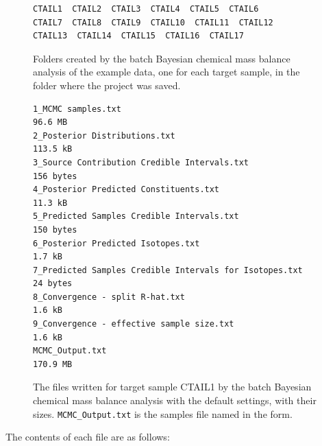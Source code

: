 \documentclass[12pt]{report}
\begin{document}
\begin{figure}[ht]
    \centering
        \begin{minipage}{0.92\textwidth}
\small
\begin{verbatim}
CTAIL1  CTAIL2  CTAIL3  CTAIL4  CTAIL5  CTAIL6
CTAIL7  CTAIL8  CTAIL9  CTAIL10  CTAIL11  CTAIL12
CTAIL13  CTAIL14  CTAIL15  CTAIL16  CTAIL17
\end{verbatim}
    \end{minipage}
    \caption{Folders created by the batch Bayesian chemical mass balance analysis of the example data, one for each target sample, in the folder where the project was saved.}
    \label{fig:MCMC-folders}
\end{figure}
\FloatBarrier

\begin{figure}[ht]
    \centering
        \begin{minipage}{0.92\textwidth}
\small
\begin{verbatim}
1_MCMC samples.txt                                         96.6 MB
2_Posterior Distributions.txt                             113.5 kB
3_Source Contribution Credible Intervals.txt             156 bytes
4_Posterior Predicted Constituents.txt                     11.3 kB
5_Predicted Samples Credible Intervals.txt               150 bytes
6_Posterior Predicted Isotopes.txt                          1.7 kB
7_Predicted Samples Credible Intervals for Isotopes.txt   24 bytes
8_Convergence - split R-hat.txt                             1.6 kB
9_Convergence - effective sample size.txt                   1.6 kB
MCMC_Output.txt                                           170.9 MB
\end{verbatim}
    \end{minipage}
    \caption{The files written for target sample CTAIL1 by the batch Bayesian chemical mass balance analysis with the default settings, with their sizes. \texttt{MCMC\_Output.txt} is the samples file named in the form.}
    \label{fig:MCMC-files}
\end{figure}
\FloatBarrier

The contents of each file are as follows:
\end{document}
